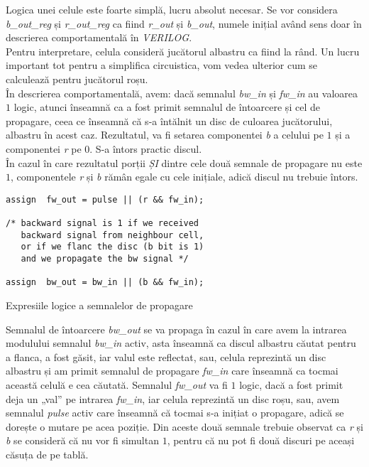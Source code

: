 \documentclass[12pt,twoside,a4paper,fleqn]{book}
\theoremstyle{definition}
\begin{document}
Logica unei celule este foarte simplă, lucru absolut necesar. Se vor considera \emph{b\_out\_reg} și \emph{r\_out\_reg} ca fiind \emph{r\_out} și \emph{b\_out}, numele inițial având sens doar în descrierea comportamentală în \emph{VERILOG}.\\
Pentru interpretare, celula consideră jucătorul albastru ca fiind la rând. Un lucru important tot pentru a simplifica circuistica, vom vedea ulterior cum se calculează pentru jucătorul roșu.\\
În descrierea comportamentală, avem: dacă semnalul \emph{bw\_in} și \emph{fw\_in} au valoarea $1$ logic, atunci înseamnă ca a fost primit semnalul de întoarcere și cel de propagare, ceea ce înseamnă că s-a întălnit un disc de culoarea jucătorului, albastru în acest caz. Rezultatul, va fi setarea componentei \emph{b} a celului pe $1$ și a componentei \emph{r} pe $0$. S-a întors practic discul.\\
În cazul în care rezultatul porții \emph{ȘI} dintre cele două semnale de propagare nu este $1$, componentele \emph{r} și \emph{b} rămân egale cu cele inițiale, adică discul nu trebuie întors.

\begin{fragmentsursa}
\begin{verbatim}
assign 	fw_out = pulse || (r && fw_in);

/* backward signal is 1 if we received 
   backward signal from neighbour cell, 
   or if we flanc the disc (b bit is 1)
   and we propagate the bw signal */
   
assign	bw_out = bw_in || (b && fw_in);
\end{verbatim}
\caption{Expresiile logice a semnalelor de propagare}
\end{fragmentsursa}

Semnalul de întoarcere \emph{bw\_out} se va propaga în cazul în care avem la intrarea modulului semnalul \emph{bw\_in} activ, asta înseamnă ca discul albastru căutat pentru a flanca, a fost găsit, iar valul este reflectat, sau, celula reprezintă un disc albastru și am primit semnalul de propagare \emph{fw\_in} care înseamnă ca tocmai această celulă e cea căutată.
Semnalul \emph{fw\_out} va fi $1$ logic, dacă a fost primit deja un „val” pe intrarea \emph{fw\_in}, iar celula reprezintă un disc roșu, sau, avem semnalul \emph{pulse} activ care înseamnă că tocmai s-a inițiat o propagare, adică se dorește o mutare pe acea poziție. Din aceste două semnale trebuie observat ca \emph{r} și \emph{b} se consideră că nu vor fi simultan $1$, pentru că nu pot fi două discuri pe aceași căsuța de pe tablă.
\end{document}
